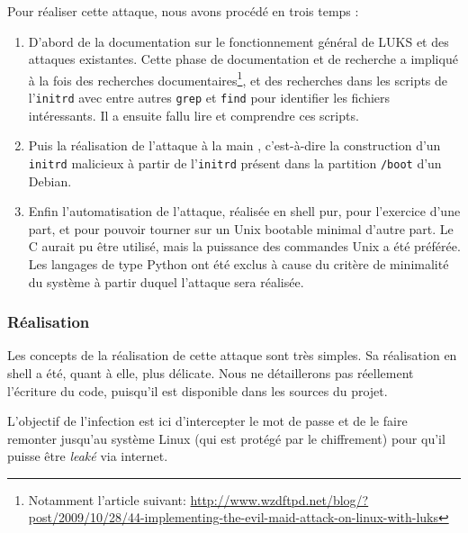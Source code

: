 \documentclass[12pt,a4paper]{article}
\begin{document}
Pour réaliser cette attaque, nous avons procédé en trois temps :
\begin{enumerate}
    \item D'abord de la documentation sur le fonctionnement général de LUKS et
    des attaques existantes. Cette phase de documentation et de recherche a
    impliqué à la fois des recherches documentaires\footnote{Notamment l'article suivant: \url{http://www.wzdftpd.net/blog/?post/2009/10/28/44-implementing-the-evil-maid-attack-on-linux-with-luks}},
    et des recherches dans les scripts de l'\texttt{initrd} avec entre autres
    \texttt{grep} et \texttt{find} pour identifier les fichiers intéressants.
    Il a ensuite fallu lire et comprendre ces scripts.
    \item Puis la réalisation de l'attaque \og à la main \fg, c'est-à-dire la 
    construction d'un \texttt{initrd} malicieux à partir de l'\texttt{initrd} présent dans la
    partition \texttt{/boot} d'un Debian.
    \item Enfin l'automatisation de l'attaque, réalisée en shell pur, pour 
    l'exercice d'une part, et pour pouvoir tourner sur un Unix bootable minimal
    d'autre part. Le C aurait pu être utilisé, mais la puissance des commandes
    Unix a été préférée. Les langages de type Python ont été exclus à cause du
    critère de minimalité du système à partir duquel l'attaque sera réalisée.
\end{enumerate}


\subsubsection*{Réalisation}
Les concepts de la réalisation de cette attaque sont très simples. Sa réalisation
en shell a été, quant à elle, plus délicate. Nous ne détaillerons pas réellement
l'écriture du code, puisqu'il est disponible dans les sources du projet.

L'objectif de l'infection est ici d'intercepter le mot de passe et de le faire
remonter jusqu'au système Linux (qui est protégé par le chiffrement) pour qu'il
puisse être \textit{leaké} via internet.
\end{document}
